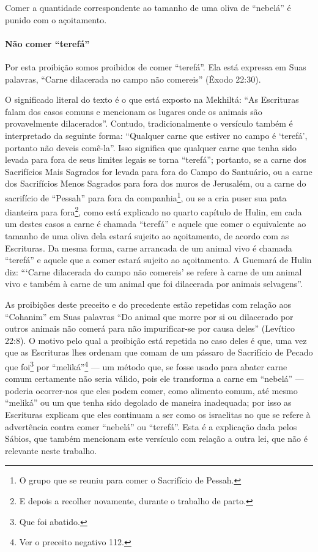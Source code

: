 Comer a quantidade correspondente ao tamanho de uma oliva de ``nebelá''
é punido com o açoitamento.

\paragraph{Não comer ``terefá''}

Por esta proibição somos proibidos de comer ``terefá''. Ela está
expressa em Suas palavras, ``Carne dilacerada no campo não comereis''
(Êxodo 22:30).

O significado literal do texto é o que está exposto na Mekhiltá: ``As
Escrituras falam dos casos comuns e mencionam os lugares onde os
animais são provavelmente dilacerados''. Contudo, tradicionalmente o
versículo também é interpretado da seguinte forma: ``Qualquer carne que
estiver no campo é `terefá', portanto não deveis comê-la''. Isso
significa que qualquer carne que tenha sido levada para fora de seus
limites legais se torna ``terefá''; portanto, se a carne dos Sacrifícios
Mais Sagrados for levada para fora do Campo do Santuário, ou a carne
dos Sacrifícios Menos Sagrados para fora dos muros de Jerusalém, ou a
carne do sacrifício de ``Pessah'' para fora da companhia\footnote{O grupo que se reuniu para comer o Sacrifício de Pessah.}, ou se a cria puser sua pata dianteira para
fora\footnote{E depois a recolher novamente, durante o trabalho de parto.}, como está explicado no quarto capítulo de
Hulin, em cada um destes casos a carne é chamada ``terefá'' e aquele que
comer o equivalente ao tamanho de uma oliva dela estará sujeito ao
açoitamento, de acordo com as Escrituras. Da mesma forma, carne
arrancada de um animal vivo é chamada ``terefá'' e aquele que a comer
estará sujeito ao açoitamento. A Guemará de Hulin diz: ```Carne
dilacerada do campo não comereis' se refere à carne de um animal vivo e
também à carne de um animal que foi dilacerada por animais selvagens''.

As proibições deste preceito e do precedente estão repetidas com relação
aos ``Cohanim'' em Suas palavras ``Do animal que morre por si ou
dilacerado por outros animais não comerá para não impurificar-se por
causa deles'' (Levítico 22:8). O motivo pelo qual a proibição está
repetida no caso deles é que, uma vez que as Escrituras lhes ordenam que
comam de um pássaro de Sacrifício de Pecado que
foi\footnote{Que foi abatido.} por ``meliká''\footnote{Ver o preceito negativo 112.} --- um
método que, se fosse usado para abater carne comum certamente não seria
válido, pois ele transforma a carne em ``nebelá'' --- poderia
ocorrer-nos que eles podem comer, como alimento comum, até mesmo
``meliká'' ou um que tenha sido degolado de maneira inadequada; por
isso as Escrituras explicam que eles continuam a ser como os israelitas
no que se refere à advertência contra comer ``nebelá'' ou ``terefá''.
Esta é a explicação dada pelos Sábios, que também mencionam este
versículo com relação a outra lei, que não é relevante neste trabalho.

